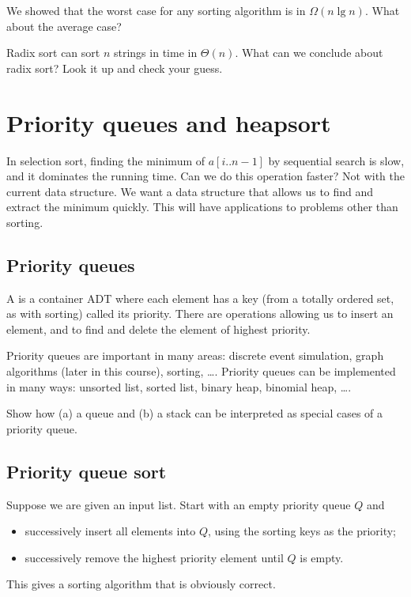 \begin{Boxample}[4]
We showed that the worst case for any sorting algorithm is in $\Omega (n \lg n)$. What about the average case?
\end{Boxample}

\begin{Boxample}[2]
Radix sort can sort $n$ strings in time in $\Theta(n)$.
What can we conclude about radix sort? Look it up and check your guess.
\end{Boxample}



\chapter{Priority queues and heapsort} %
\label{sec:heapsort}
In selection sort, finding the minimum of $a[i..n-1]$ by sequential search is slow, 
and it dominates the running time. 
Can we do this operation faster? Not with the current data structure. 
We want a data structure that allows us to find and extract the minimum quickly. 
This will have applications to problems other than sorting.

\section{Priority queues}
\begin{Definition}
A  is a container ADT where each element 
has a key (from a totally ordered set, as with sorting) called its priority. There are operations allowing us to insert an 
element, and to find and delete the element of highest priority. 
\end{Definition}

Priority queues are important in many areas: discrete event simulation, 
graph algorithms (later in this course), sorting, \dots .
Priority queues can be implemented in many ways: unsorted list, sorted 
list, binary heap, binomial heap, \dots . 

\begin{Boxample}[5]
Show how (a) a queue and (b) a stack can be interpreted as special cases of a priority queue.
\end{Boxample}

\section{Priority queue sort}
Suppose we are given an input list. Start with an empty priority queue $Q$
and
\begin{itemize}
\item successively insert all elements into $Q$, using the sorting keys as the 
priority;
\item successively remove the highest priority element until $Q$ is empty. 
\end{itemize}
This gives a sorting algorithm that is obviously correct. 

